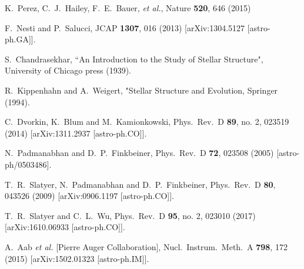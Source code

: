 K.~Perez, C.~J.~Hailey, F.~E.~Bauer, {\it et al.}, Nature {\bf 520}, 646 (2015)

  F.~Nesti and P.~Salucci,
  JCAP {\bf 1307}, 016 (2013)
  [arXiv:1304.5127 [astro-ph.GA]].


S.~Chandrasekhar, ``An Introduction to the Study of Stellar Structure", University of Chicago press (1939).

R.~Kippenhahn and A.~Weigert, "Stellar Structure and Evolution, Springer (1994).

  C.~Dvorkin, K.~Blum and M.~Kamionkowski,
  Phys.\ Rev.\ D {\bf 89}, no. 2, 023519 (2014)
  [arXiv:1311.2937 [astro-ph.CO]].


  N.~Padmanabhan and D.~P.~Finkbeiner,
  Phys.\ Rev.\ D {\bf 72}, 023508 (2005)
  [astro-ph/0503486].


  T.~R.~Slatyer, N.~Padmanabhan and D.~P.~Finkbeiner,
  Phys.\ Rev.\ D {\bf 80}, 043526 (2009)
  [arXiv:0906.1197 [astro-ph.CO]].


  T.~R.~Slatyer and C.~L.~Wu,
  Phys.\ Rev.\ D {\bf 95}, no. 2, 023010 (2017)
  [arXiv:1610.06933 [astro-ph.CO]].


  A.~Aab {\it et al.} [Pierre Auger Collaboration],
  Nucl.\ Instrum.\ Meth.\ A {\bf 798}, 172 (2015)
  [arXiv:1502.01323 [astro-ph.IM]].



